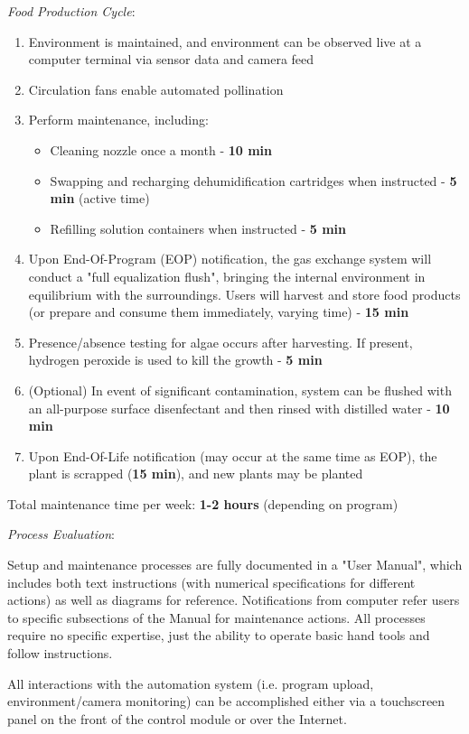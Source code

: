 \newpage

\textit{Food Production Cycle}:

\begin{enumerate}
    \item Environment is maintained, and environment can be observed live at a computer terminal via sensor data and camera feed
    \item Circulation fans enable automated pollination
    \item Perform maintenance, including:
    \begin{itemize}
        \item Cleaning nozzle once a month - \textbf{10 min}
        \item Swapping and recharging dehumidification cartridges when instructed - \textbf{5 min} (active time)
        \item Refilling solution containers when instructed - \textbf{5 min}
    \end{itemize}
    \item Upon End-Of-Program (EOP) notification, the gas exchange system will conduct a "full equalization flush", bringing the internal environment in equilibrium with the surroundings. Users will harvest and store food products (or prepare and consume them immediately, varying time) - \textbf{15 min}
    \item Presence/absence testing for algae occurs after harvesting. If present, hydrogen peroxide is used to kill the growth - \textbf{5 min}
    \item (Optional) In event of significant contamination, system can be flushed with an all-purpose surface disenfectant and then rinsed with distilled water - \textbf{10 min}
    \item Upon End-Of-Life notification (may occur at the same time as EOP), the plant is scrapped (\textbf{15 min}), and new plants may be planted
\end{enumerate}

Total maintenance time per week: \textbf{1-2 hours} (depending on program)

\textit{Process Evaluation}:

Setup and maintenance processes are fully documented in a "User Manual", which includes both text instructions (with numerical specifications for different actions) as well as diagrams for reference. Notifications from computer refer users to specific subsections of the Manual for maintenance actions. All processes require no specific expertise, just the ability to operate basic hand tools and follow instructions.

All interactions with the automation system (i.e. program upload, environment/camera monitoring) can be accomplished either via a touchscreen panel on the front of the control module or over the Internet.